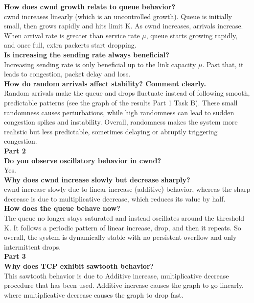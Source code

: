 \documentclass[a4paper,12pt]{article}
\begin{document}
\noindent
\textbf{How does cwnd growth relate to queue behavior?}\\
cwnd increases linearly (which is an uncontrolled growth). Queue is initially small, then grows rapidly and hits limit K. As cwnd increases, arrivals increase. When arrival rate is greater than service rate $\mu$, queue starts growing rapidly, and once full, extra packerts start dropping.\\

\noindent
\textbf{Is increasing the sending rate always beneficial?}\\
Increasing sending rate is only beneficial up to the link capacity $\mu$. Past that, it leads to congestion, packet delay and loss.\\

\noindent
\textbf{How do random arrivals affect stability? Comment clearly.}\\
Random arrivals make the queue and drops fluctuate instead of following smooth, predictable patterns (see the graph of the results Part 1 Task B). These small randomness causes perturbations, while high randomness can lead to sudden congestion spikes and instability. Overall, randomness makes the system more realistic but less predictable, sometimes delaying or abruptly triggering congestion.\\

\noindent
\textbf{Part 2}\\
\noindent
\textbf{Do you observe oscillatory behavior in cwnd?}\\
Yes.\\

\noindent
\textbf{Why does cwnd increase slowly but decrease sharply?}\\
cwnd increase slowly due to linear increase (additive) behavior, whereas the sharp decrease is due to multiplicative decrease, which reduces its value by half.\\

\noindent
\textbf{How does the queue behave now?}\\
The queue no longer stays saturated and instead oscillates around the threshold  K. It follows a periodic pattern of linear increase, drop, and then it repeats. So overall, the system is dynamically stable with no persistent overflow and only intermittent drops.\\

\noindent
\textbf{Part 3}\\
\noindent
\textbf{Why does TCP exhibit sawtooth behavior?}\\
This sawtooth behavior is due to Additive increase, multiplicative decrease procedure that has been used. Additive increase causes the graph to go linearly, where multiplicative decrease causes the graph to drop fast.\\
\end{document}
